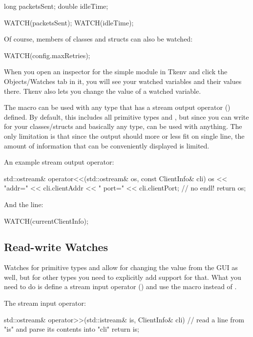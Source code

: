 \begin{cpp}
long packetsSent;
double idleTime;

WATCH(packetsSent);
WATCH(idleTime);
\end{cpp}

Of course, members of classes and structs can also be watched:

\begin{cpp}
WATCH(config.maxRetries);
\end{cpp}

When you open an inspector for the simple module in Tkenv and click
the Objects/Watches tab in it, you will see your watched variables
and their values there. Tkenv also lets you change the value of a
watched variable.

The  macro can be used with any type that has a
stream output operator () defined. By default,
this includes all primitive types and , but since
you can write  for your classes/structs and basically
any type,  can be used with anything. The only limitation
is that since the output should more or less fit on single line, the
amount of information that can be conveniently displayed is limited.

An example stream output operator:

\begin{cpp}
std::ostream& operator<<(std::ostream& os, const ClientInfo& cli)
{
    os << "addr=" << cli.clientAddr << "  port=" << cli.clientPort; // no endl!
    return os;
}
\end{cpp}

And the  line:

\begin{cpp}
WATCH(currentClientInfo);
\end{cpp}


\subsection{Read-write Watches}

Watches for primitive types and  allow for changing
the value from the GUI as well, but for other types you need to explicitly
add support for that. What you need to do is define a stream input
operator () and use the  macro instead of
.

The stream input operator:

\begin{cpp}
std::ostream& operator>>(std::istream& is, ClientInfo& cli)
{
    // read a line from "is" and parse its contents into "cli"
    return is;
}
\end{cpp}


